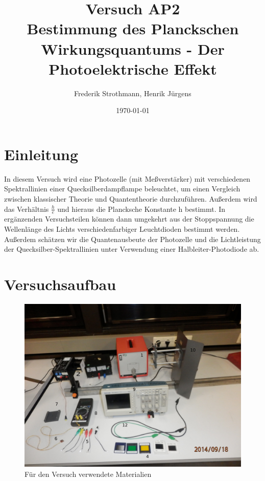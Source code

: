 \documentclass[12px]{scrartcl}
\title{Versuch AP2\\ Bestimmung des Planckschen Wirkungsquantums - Der Photoelektrische Effekt}
\author{Frederik Strothmann, Henrik Jürgens}
\date{\today}
\begin{document}

\maketitle
\newpage
\tableofcontents
\newpage


\section{Einleitung}

In diesem Versuch wird eine Photozelle (mit Meßverstärker) mit verschiedenen Spektrallinien einer Quecksilberdampflampe beleuchtet, um einen Vergleich zwischen klassischer Theorie und Quantentheorie durchzuführen.
Außerdem wird das Verhältnis $\frac{h}{e}$ und hieraus die Plancksche Konstante h
bestimmt.
In ergänzenden Versuchsteilen können dann umgekehrt aus der Stoppspannung die Wellenlänge des Lichts verschiedenfarbiger Leuchtdioden bestimmt werden.
Außerdem schätzen wir die Quantenausbeute der Photozelle und die Lichtleistung der Quecksilber-Spektrallinien
unter Verwendung einer Halbleiter-Photodiode ab.

\section{Versuchsaufbau}
													
\begin{figure}[H]
\centering
    \includegraphics[scale = 0.2]{versuchsmaterialien.pdf}
  	\caption[Für den Versuch verwendete Materialien]{Für den Versuch verwendete Materialien}
  \label{fig:a_3_A}
\end{figure}
\end{document}
